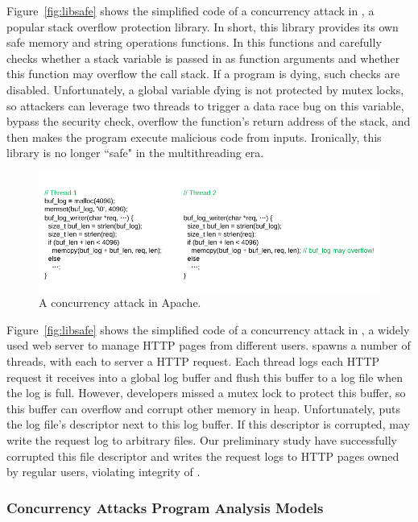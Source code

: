 Figure~\ref{fig:libsafe} shows the simplified code of a concurrency attack in 
\libsafe, a popular stack overflow protection library. In short, this library 
provides its own safe memory and string operations functions. In this 
functions and carefully checks whether a stack variable is passed in as 
function arguments and whether this function may overflow the call stack. If a 
program is dying, such checks are disabled. Unfortunately, a global variable 
\v{dying} is not protected by mutex locks, so attackers can leverage two 
threads to trigger a data race bug on this variable, bypass the security 
check, overflow the function's return address of the stack, and then makes the 
program execute malicious code from inputs. Ironically, this \libsafe library 
is no longer ``safe" in the multithreading era.

\begin{figure}[t]
\centering
\includegraphics[width=0.99\columnwidth]{figures/apache}
\vspace{-.05in}
\caption{{A concurrency attack in Apache.}} \label{fig:apache}
\vspace{-.05in}
\end{figure}

Figure~\ref{fig:libsafe} shows the simplified code of a concurrency attack in 
\apache, a widely used web server to manage HTTP pages from different users. 
\apache spawns a number of threads, with each to server a HTTP request. Each 
thread logs each HTTP request it receives into a global log buffer and flush 
this buffer to a log file when the log is full. However, developers missed a 
mutex lock to protect this buffer, so this buffer can overflow and corrupt 
other memory in heap. Unfortunately, \apache puts the log file's descriptor next 
to this log buffer. If this descriptor is corrupted, \apache may write the 
request log to arbitrary files. Our preliminary study have successfully 
corrupted this file descriptor and writes the request logs to HTTP pages owned 
by regular users, violating integrity of \apache.

\subsubsection{Concurrency Attacks Program Analysis Models} 
\label{sec:attack-phase}

